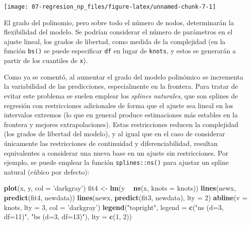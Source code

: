 \documentclass[
]{book}
\newenvironment{Shaded}{\begin{snugshade}}{\end{snugshade}}
\newcommand{\DataTypeTok}[1]{\textcolor[rgb]{0.13,0.29,0.53}{#1}}
\newcommand{\DecValTok}[1]{\textcolor[rgb]{0.00,0.00,0.81}{#1}}
\newcommand{\KeywordTok}[1]{\textcolor[rgb]{0.13,0.29,0.53}{\textbf{#1}}}
\newcommand{\NormalTok}[1]{#1}
\newcommand{\OperatorTok}[1]{\textcolor[rgb]{0.81,0.36,0.00}{\textbf{#1}}}
\newcommand{\StringTok}[1]{\textcolor[rgb]{0.31,0.60,0.02}{#1}}
\theoremstyle{break}
\theoremstyle{definition}
\theoremstyle{definition}
\theoremstyle{definition}
\theoremstyle{remark}
\begin{document}
\begin{center}\texttt{[image: 07-regresion\_np\_files/figure-latex/unnamed-chunk-7-1]} \end{center}

El grado del polinomio, pero sobre todo el número de nodos, determinarán la flexibilidad del modelo.
Se podrían considerar el número de parámetros en el ajuste lineal, los grados de libertad, como medida de la complejidad (en la función \texttt{bs()} se puede especificar \texttt{df} en lugar de \texttt{knots}, y estos se generarán a partir de los cuantiles de \texttt{x}).

Como ya se comentó, al aumentar el grado del modelo polinómico se incrementa la variabilidad de las predicciones, especialmente en la frontera.
Para tratar de evitar este problema se suelen emplear los \emph{splines naturales}, que son splines de regresión con restricciones adicionales de forma que el ajuste sea lineal en los intervalos extremos (lo que en general produce estimaciones más estables en la frontera y mejores extrapolaciones).
Estas restricciones reducen la complejidad (los grados de libertad del modelo), y al igual que en el caso de considerar únicamente las restricciones de continuidad y diferenciabilidad, resultan equivalentes a considerar una nueva base en un ajuste sin restricciones.
Por ejemplo, se puede emplear la función \texttt{splines::ns()} para ajustar un spline natural (cúbico por defecto):

\begin{Shaded}
\begin{Highlighting}[]
\KeywordTok{plot}\NormalTok{(x, y, }\DataTypeTok{col =} \StringTok{'darkgray'}\NormalTok{)}
\NormalTok{fit4 <-}\StringTok{ }\KeywordTok{lm}\NormalTok{(y }\OperatorTok{~}\StringTok{ }\KeywordTok{ns}\NormalTok{(x, }\DataTypeTok{knots =}\NormalTok{ knots))}
\KeywordTok{lines}\NormalTok{(newx, }\KeywordTok{predict}\NormalTok{(fit4, newdata))}
\KeywordTok{lines}\NormalTok{(newx, }\KeywordTok{predict}\NormalTok{(fit3, newdata), }\DataTypeTok{lty =} \DecValTok{2}\NormalTok{)}
\KeywordTok{abline}\NormalTok{(}\DataTypeTok{v =}\NormalTok{ knots, }\DataTypeTok{lty =} \DecValTok{3}\NormalTok{, }\DataTypeTok{col =} \StringTok{'darkgray'}\NormalTok{)}
\KeywordTok{legend}\NormalTok{(}\StringTok{"topright"}\NormalTok{, }\DataTypeTok{legend =} \KeywordTok{c}\NormalTok{(}\StringTok{"ns (d=3, df=11)"}\NormalTok{, }\StringTok{"bs (d=3, df=13)"}\NormalTok{), }\DataTypeTok{lty =} \KeywordTok{c}\NormalTok{(}\DecValTok{1}\NormalTok{, }\DecValTok{2}\NormalTok{))}
\end{Highlighting}
\end{Shaded}
\end{document}
